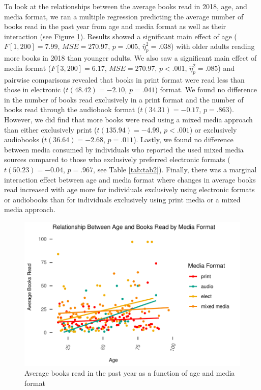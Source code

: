 \documentclass[man, fleqn, noextraspace]{apa6}
\theoremstyle{definition}
\theoremstyle{definition}
\theoremstyle{definition}
\theoremstyle{remark}
\begin{document}
To look at the relationships between the average books read in 2018,
age, and media format, we ran a multiple regression predicting the
average number of books read in the past year from age and media format
as well as their interaction (see Figure \ref{fig:fig4}). Results showed
a significant main effect of age (\(F[1, 200] = 7.99\),
\(\mathit{MSE} = 270.97\), \(p = .005\), \(\hat{\eta}^2_p = .038\)) with
older adults reading more books in 2018 than younger adults. We also saw
a significant main effect of media format (\(F[3, 200] = 6.17\),
\(\mathit{MSE} = 270.97\), \(p < .001\), \(\hat{\eta}^2_p = .085\)) and
pairwise comparisons revealed that books in print format were read less
than those in electronic (\(t(48.42) = -2.10\), \(p = .041\)) format. We
found no difference in the number of books read exclusively in a print
format and the number of books read through the audiobook format
(\(t(34.31) = -0.17\), \(p = .863\)). However, we did find that more
books were read using a mixed media approach than either exclusively
print (\(t(135.94) = -4.99\), \(p < .001\)) or exclusively audiobooks
(\(t(36.64) = -2.68\), \(p = .011\)). Lastly, we found no difference
between media consumed by individuals who reported the used mixed media
sources compared to those who exclusively preferred electronic formats
(\(t(50.23) = -0.04\), \(p = .967\), see Table \ref{tab:tab2}). Finally,
there was a marginal interaction effect between age and media format
where changes in average books read increased with age more for
individuals exclusively using electronic formats or audiobooks than for
individuals exclusively using print media or a mixed media approach.

\begin{figure}
\centering
\includegraphics{final_manuscript_files/figure-latex/fig4-1.pdf}
\caption{\label{fig:fig4}Average books read in the past year as a function
of age and media format}
\end{figure}
\end{document}
